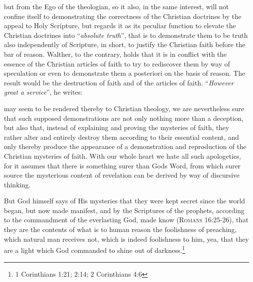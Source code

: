 but from the Ego of the theologian, so it also, in the same interest, will not confine itself to demonstrating the correctness of the Christian doctrines by the appeal to Holy Scripture, but regards it as its peculiar function to elevate the Christian doctrines into “\textit{absolute truth}”, that is to demonstrate them to be truth also independently of Scripture, in short, to justify the Christian faith before the bar of reason.  Walther, to the contrary, holds that it is in conflict with the essence of the Christian articles of faith to try to rediscover them by way of speculation or even to demonstrate them a posteriori on the basis of reason.  The result would be the destruction of faith and of the articles of faith.  “\textit{However great a service}”, he writes: \begin{fancyquotes}may seem to be rendered thereby to Christian theology, we are nevertheless sure that such supposed demonstrations are not only nothing more than a deception, but also that, instead of explaining and proving the mysteries of faith, they rather alter and entirely destroy them according to their essential content, and only thereby produce the appearance of a demonstration and reproduction of the Christian mysteries of faith.  With our whole heart we hate all such apologetics, for it assumes that there is something surer than Gods Word, from which surer source the mysterious content of revelation can be derived by way of discursive thinking.

                But God himself says of His mysteries that they were kept secret since the world began, but now made manifest, and by the Scriptures of the prophets, according to the commandment of the everlasting God, made know {\scriptsize\textsc{(Romans 16:25-26)}}, that they are the contents of what is to human reason the foolishness of preaching, which natural man receives not, which is indeed foolishness to him, yea, that they are a light which God commanded to shine out of darkness.\footnote{1 Corinthians 1:21; 2:14; 2 Corinthians 4:6}
\end{fancyquotes}
